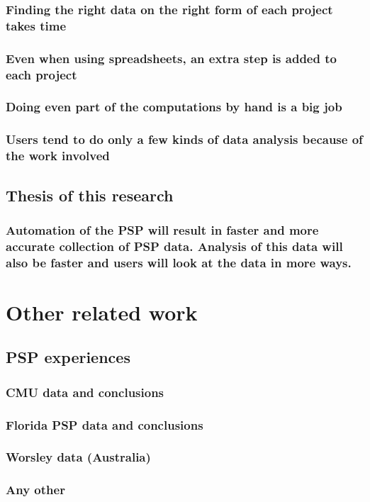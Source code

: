 \subsection{Finding the right data on the right form of each project takes time}
\subsection{Even when using spreadsheets, an extra step is added to each project}
\subsection{Doing even part of the computations by hand is a big job}
\subsection{Users tend to do only a few kinds of data analysis because of the work involved}
\section{Thesis of this research}
\subsection{Automation of the PSP will result in faster and more accurate collection of PSP data.  Analysis of this data will also be faster and users will look at the data 
in more ways.}
\chapter{Other related work}
\section{PSP experiences}
\subsection{CMU data and conclusions}
\subsection{Florida PSP data and conclusions}
\subsection{Worsley data (Australia)}
\subsection{Any other}
